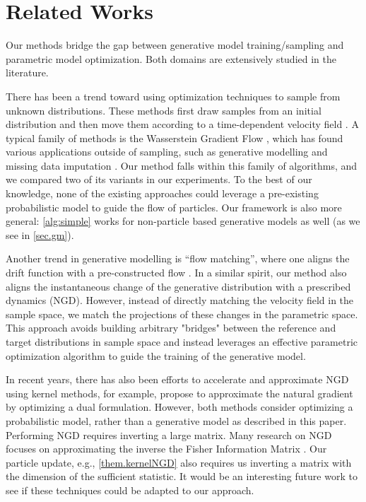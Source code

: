 \section{Related Works}
Our methods bridge the gap between generative model training/sampling and parametric model optimization. Both domains are extensively studied in the literature. 

There has been a trend toward using optimization techniques to sample from unknown distributions. These methods first draw samples from an initial distribution and then move them according to a time-dependent velocity field \citep{liu2017stein,Chewi2020,maurais2024sampling}. A typical family of methods is the Wasserstein Gradient Flow \citep{ambrosio2008gradient}, which has found various applications outside of sampling, such as generative modelling \citep{gaodeep19,choi2024scalable} and missing data imputation \citep{chen2024rethinking}. Our method falls within this family of algorithms, and we compared two of its variants in our experiments. 
To the best of our knowledge, none of the existing approaches could leverage a pre-existing probabilistic model to guide the flow of particles. Our framework is also more general: \cref{alg:simple} works for non-particle based generative models as well (as we see in \cref{sec.gm}). 

Another trend in generative modelling is ``flow matching'', where one aligns the drift function with a pre-constructed flow \citep{lipman2023flow,liu2023flow}. In a similar spirit, our method also aligns the instantaneous change of the generative  distribution with a prescribed dynamics (NGD). However, instead of directly matching the velocity field in the sample space, we match the projections of these changes in the parametric space. This approach avoids building arbitrary "bridges" between the reference and target distributions in sample space and instead leverages an effective parametric optimization algorithm to guide the training of the generative model.

In recent years, there has also been efforts to accelerate and approximate NGD using kernel methods, for example,   \citep{Arbel2020Kernelized,Li2019Affine} propose to approximate the natural gradient by optimizing a dual formulation. 
However, both methods consider optimizing a probabilistic model, rather than a generative model as described in this paper. Performing NGD requires inverting a large matrix. 
Many research on NGD focuses on approximating the inverse the Fisher Information Matrix \citep{martens15optimizing,grosse2016kronecker,george2018fast}. 
Our particle update, e.g., \cref{them.kernelNGD} also requires us inverting a matrix with the dimension of the sufficient statistic. 
It would be an interesting future work to see if these techniques could be adapted to our approach.
